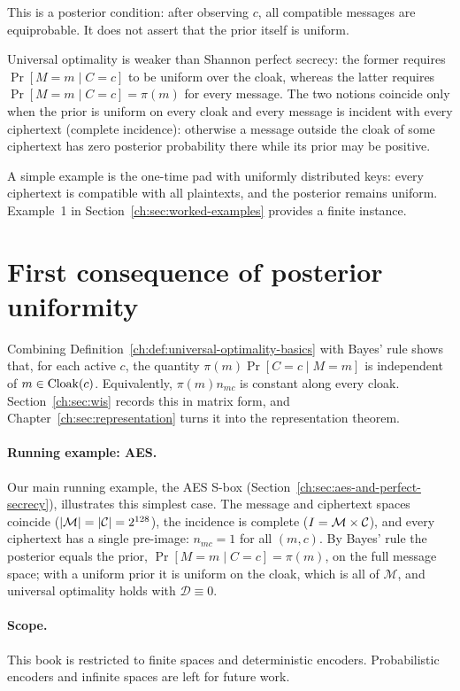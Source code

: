 This is a posterior condition: after observing $c$, all compatible
messages are equiprobable.  It does not assert that the prior itself is
uniform.

\begin{remark}
Universal optimality is weaker than Shannon perfect secrecy: the former
requires $\Pr[M=m\mid C=c]$ to be uniform over the cloak, whereas the
latter requires $\Pr[M=m\mid C=c]=\pi(m)$ for every message.  The two
notions coincide only when the prior is uniform on every cloak and
every message is incident with every ciphertext (complete incidence):
otherwise a message outside the cloak of some ciphertext has zero
posterior probability there while its prior may be positive.
\end{remark}

A simple example is the one-time pad with uniformly distributed keys:
every ciphertext is compatible with all plaintexts, and the posterior
remains uniform.  Example~1 in Section~\ref{ch:sec:worked-examples}
provides a finite instance.

\section{First consequence of posterior uniformity}\label{ch:sec:first-consequence-of-posterior-uniformity}

Combining Definition~\ref{ch:def:universal-optimality-basics} with
Bayes' rule shows that, for each active $c$, the quantity
$\pi(m)\Pr[C=c\mid M=m]$ is independent of $m\in\operatorname{Cloak}(c)$.
Equivalently, $\pi(m)n_{mc}$ is constant along every cloak.
Section~\ref{ch:sec:wis} records this in matrix form, and
Chapter~\ref{ch:sec:representation} turns it into the representation
theorem.

\paragraph{Running example: AES.}
Our main running example, the AES S-box (Section~\ref{ch:sec:aes-and-perfect-secrecy}), illustrates this simplest case.  The message and ciphertext spaces coincide ($|\mathcal{M}|=|\mathcal{C}|=2^{128}$), the incidence is complete ($I=\mathcal{M}\times\mathcal{C}$), and every ciphertext has a single pre-image: $n_{mc}=1$ for all $(m,c)$.  By Bayes' rule the posterior equals the prior, $\Pr[M=m\mid C=c]=\pi(m)$, on the full message space; with a uniform prior it is uniform on the cloak, which is all of $\mathcal M$, and universal optimality holds with $\mathcal D\equiv0$.

\paragraph{Scope.}
This book is restricted to finite spaces and deterministic encoders.
Probabilistic encoders and infinite spaces are left for future work.
\endinput